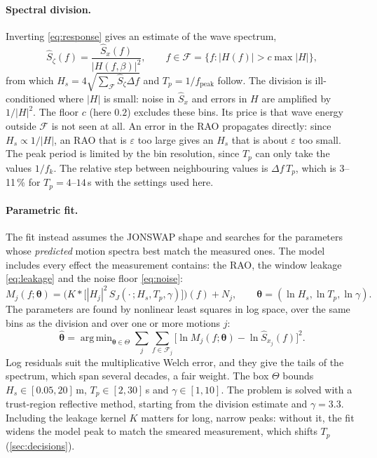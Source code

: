 \documentclass[11pt,a4paper]{article}
\newcommand{\Hs}{H_{s}}
\newcommand{\Tp}{T_{p}}
\newcommand{\vect}[1]{\boldsymbol{#1}}
\DeclareMathOperator*{\argmin}{arg\,min}
\begin{document}
\paragraph{Spectral division.}
Inverting \cref{eq:response} gives an estimate of the wave spectrum,
\begin{equation}
  \hat S_\zeta(f) = \frac{\hat S_x(f)}{|H(f, \beta)|^2},
  \qquad f \in \mathcal{F} = \{ f : |H(f)| > c \max |H| \},
  \label{eq:division}
\end{equation}
from which $\Hs = 4\sqrt{\sum_{\mathcal{F}} \hat S_\zeta \Delta f}$ and $\Tp = 1/f_{\text{peak}}$
follow. The division is ill-conditioned where $|H|$ is small: noise in $\hat S_x$ and errors
in $H$ are amplified by $1/|H|^2$. The floor $c$ (here $0.2$) excludes these bins. Its price
is that wave energy outside $\mathcal{F}$ is not seen at all. An error in the RAO propagates
directly: since $\Hs \propto 1/|H|$, an RAO that is $\varepsilon$ too large gives an $\Hs$ that
is about $\varepsilon$ too small. The peak period is limited by the bin resolution, since
$\Tp$ can only take the values $1/f_k$. The relative step between neighbouring values is
$\Delta f\,\Tp$, which is 3--11\,\% for $\Tp = 4$--$14$\,s with the settings used here.

\paragraph{Parametric fit.}
The fit instead assumes the JONSWAP shape and searches for the parameters whose
\emph{predicted} motion spectra best match the measured ones. The model includes every effect
the measurement contains: the RAO, the window leakage \cref{eq:leakage} and the noise floor
\cref{eq:noise}:
\begin{equation}
  M_j(f; \vect\theta) = \Big( K * \big[ |H_j|^2\, S_J(\cdot\,; \Hs, \Tp, \gamma) \big] \Big)(f) + N_j,
  \qquad
  \vect\theta = (\ln\Hs, \ln\Tp, \ln\gamma).
  \label{eq:model}
\end{equation}
The parameters are found by nonlinear least squares in log space, over the same bins as the
division and over one or more motions $j$:
\begin{equation}
  \hat{\vect\theta} = \argmin_{\vect\theta \in \Theta}
    \sum_j \sum_{f \in \mathcal{F}_j}
    \big[ \ln M_j(f; \vect\theta) - \ln \hat S_{x_j}(f) \big]^2 .
  \label{eq:fit}
\end{equation}
Log residuals suit the multiplicative Welch error, and they give the tails of the spectrum,
which span several decades, a fair weight. The box $\Theta$ bounds
$\Hs \in [0.05, 20]$\,m, $\Tp \in [2, 30]$\,s and $\gamma \in [1, 10]$. The problem is solved
with a trust-region reflective method, starting from the division estimate and $\gamma = 3.3$.
Including the leakage kernel $K$ matters for long, narrow peaks: without it, the fit widens the
model peak to match the smeared measurement, which shifts $\Tp$ (\cref{sec:decisions}).
\end{document}
